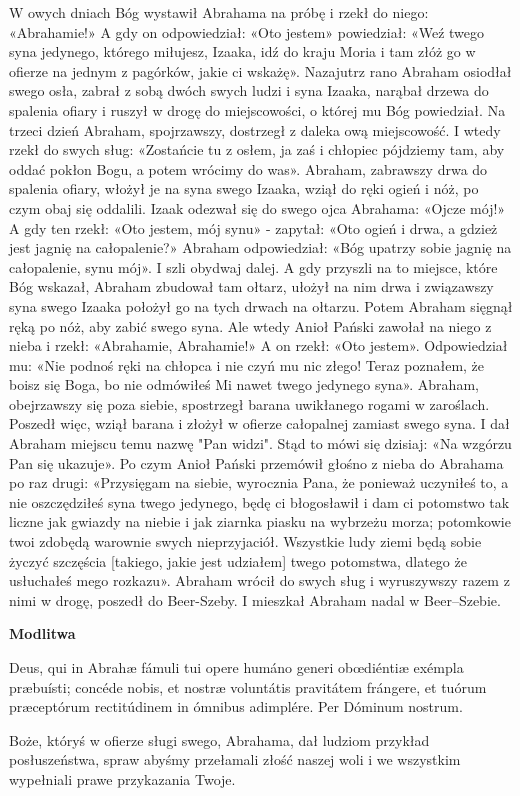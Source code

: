 \documentclass[10pt,a5paper]{book}
\newcommand{\oremus}[3]{\medskip\centerline{\textbf{#1}}\medskip
	\begin{sloppypar}
		\begin{paracol}{2}
			\setlength{\columnsep}{0em}
			\begin{leftcolumn}
				#2
			\end{leftcolumn}
			\begin{rightcolumn}
				#3
			\end{rightcolumn}
		\end{paracol}
	\end{sloppypar}}
\begin{document}
				W owych dniach Bóg wystawił Abrahama na próbę i rzekł do niego: «Abrahamie!» A gdy on odpowiedział: «Oto
				jestem» powiedział: «Weź twego syna jedynego, którego miłujesz, Izaaka, idź do kraju Moria i tam złóż go w
				ofierze na jednym z pagórków, jakie ci wskażę». Nazajutrz rano Abraham osiodłał swego osła, zabrał z sobą
				dwóch swych ludzi i syna Izaaka, narąbał drzewa do spalenia ofiary i ruszył w drogę do miejscowości, o której mu
				Bóg powiedział. Na trzeci dzień Abraham, spojrzawszy, dostrzegł z daleka ową miejscowość. I wtedy rzekł do
				swych sług: «Zostańcie tu z osłem, ja zaś i chłopiec pójdziemy tam, aby oddać pokłon Bogu, a potem wrócimy do
				was». Abraham, zabrawszy drwa do spalenia ofiary, włożył je na syna swego Izaaka, wziął do ręki ogień i nóż, po
				czym obaj się oddalili.
				Izaak odezwał się do swego ojca Abrahama: «Ojcze mój!» A gdy ten rzekł: «Oto jestem, mój synu» - zapytał: «Oto
				ogień i drwa, a gdzież jest jagnię na całopalenie?» Abraham odpowiedział:
				«Bóg upatrzy sobie jagnię na całopalenie, synu mój». I szli obydwaj dalej. A gdy przyszli na to miejsce, które Bóg
				wskazał, Abraham zbudował tam ołtarz, ułożył na nim drwa i związawszy syna swego Izaaka położył go na tych
				drwach na ołtarzu. Potem Abraham sięgnął ręką po nóż, aby zabić swego syna.
				Ale wtedy Anioł Pański zawołał na niego z nieba i rzekł: «Abrahamie, Abrahamie!» A on rzekł: «Oto jestem».
				Odpowiedział mu: «Nie podnoś ręki na chłopca i nie czyń mu nic złego! Teraz poznałem, że boisz się Boga, bo nie
				odmówiłeś Mi nawet twego jedynego syna».
				Abraham, obejrzawszy się poza siebie, spostrzegł barana uwikłanego rogami w zaroślach. Poszedł więc, wziął
				barana i złożył w ofierze całopalnej zamiast swego syna. I dał Abraham miejscu temu nazwę "Pan widzi". Stąd to
				mówi się dzisiaj: «Na wzgórzu Pan się ukazuje».
				Po czym Anioł Pański przemówił głośno z nieba do Abrahama po raz drugi: «Przysięgam na siebie, wyrocznia
				Pana, że ponieważ uczyniłeś to, a nie oszczędziłeś syna twego jedynego, będę ci błogosławił i dam ci potomstwo
				tak liczne jak gwiazdy na niebie i jak ziarnka piasku na wybrzeżu morza; potomkowie twoi zdobędą warownie
				swych nieprzyjaciół. Wszystkie ludy ziemi będą sobie życzyć szczęścia [takiego, jakie jest udziałem] twego
				potomstwa, dlatego że usłuchałeś mego rozkazu».
				Abraham wrócił do swych sług i wyruszywszy razem z nimi w drogę, poszedł do Beer-Szeby.
				I mieszkał Abraham nadal w Beer--Szebie.
				
				\oremus{Modlitwa}{
					Deus, qui in Abrahæ fámuli tui opere humáno generi
					ob\oe diéntiæ exémpla præbuísti; concéde nobis, et nostræ
					voluntátis pravitátem frángere, et tuórum præceptórum
					rectitúdinem in ómnibus adimplére. Per Dóminum
					nostrum.\\}
					{Boże, któryś w ofierze sługi swego, Abrahama, dał						ludziom przykład posłuszeństwa, spraw abyśmy przełamali złość naszej woli i we wszystkim wypełniali prawe przykazania Twoje.}
					
\end{document}
